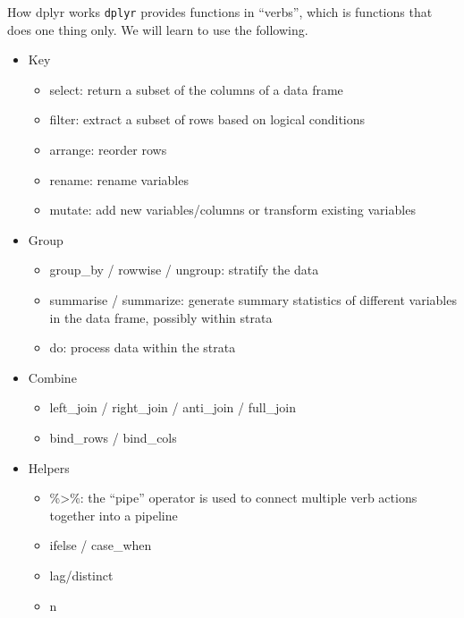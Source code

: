 \documentclass[
  10pt,
  ignorenonframetext,
  serif]{beamer}
\providecommand{\tightlist}{%
  \setlength{\itemsep}{0pt}\setlength{\parskip}{0pt}}
\begin{document}
\begin{frame}[fragile]{How dplyr works}
\protect\hypertarget{how-dplyr-works}{}
\texttt{dplyr} provides functions in ``verbs'', which is functions that
does one thing only. We will learn to use the following.

\begin{itemize}
\tightlist
\item
  Key

  \begin{itemize}
  \tightlist
  \item
    select: return a subset of the columns of a data frame
  \item
    filter: extract a subset of rows based on logical conditions
  \item
    arrange: reorder rows
  \item
    rename: rename variables
  \item
    mutate: add new variables/columns or transform existing variables
  \end{itemize}
\item
  Group

  \begin{itemize}
  \tightlist
  \item
    group\_by / rowwise / ungroup: stratify the data
  \item
    summarise / summarize: generate summary statistics of different
    variables in the data frame, possibly within strata
  \item
    do: process data within the strata
  \end{itemize}
\item
  Combine

  \begin{itemize}
  \tightlist
  \item
    left\_join / right\_join / anti\_join / full\_join
  \item
    bind\_rows / bind\_cols
  \end{itemize}
\item
  Helpers

  \begin{itemize}
  \tightlist
  \item
    \%\textgreater\%: the ``pipe'' operator is used to connect multiple
    verb actions together into a pipeline
  \item
    ifelse / case\_when
  \item
    lag/distinct
  \item
    n
  \end{itemize}
\end{itemize}
\end{frame}
\end{document}
